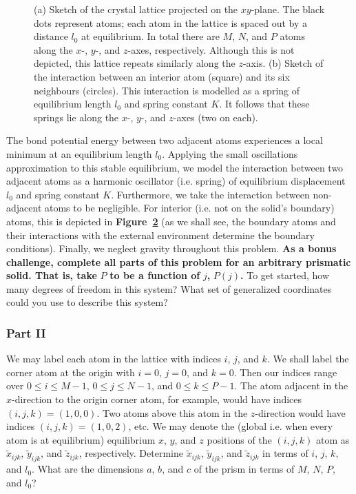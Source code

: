 \documentclass[letterpaper,12pt]{article}
\begin{document}
\begin{flushleft}
\begin{figure}[h]
\begin{subfigure}[b]{0.3\textwidth}
            \caption{}
            \label{fig:I3}
        \end{subfigure}
        \caption{(a) Sketch of the crystal lattice projected on the $xy$-plane. The black dots represent atoms; each atom in the lattice is spaced out by a distance $l_0$ at equilibrium. In total there are $M$, $N$, and $P$ atoms along the $x$-, $y$-, and $z$-axes, respectively. Although this is not depicted, this lattice repeats similarly along the $z$-axis. (b) Sketch of the interaction between an interior atom (square) and its six neighbours (circles). This interaction is modelled as a spring of equilibrium length $l_0$ and spring constant $K$. It follows that these springs lie along the $x$-, $y$-, and $z$-axes (two on each).}
    \end{figure}
    The bond potential energy between two adjacent atoms experiences a local minimum at an equilibrium length $l_0$. Applying the small oscillations approximation to this stable equilibrium, we model the interaction between two adjacent atoms as a harmonic oscillator (i.e. spring) of equilibrium displacement $l_0$ and spring constant $K$. Furthermore, we take the interaction between non-adjacent atoms to be negligible. For interior (i.e. not on the solid's boundary) atoms, this is depicted in \textbf{Figure~\ref{fig:I3}} (as we shall see, the boundary atoms and their interactions with the external environment determine the boundary conditions). Finally, we neglect gravity throughout this problem.\newline\newline
    \textbf{As a bonus challenge, complete all parts of this problem for an arbitrary prismatic solid. That is, take} $P$ \textbf{to be a function of} $j$\textbf{,} $P(j)$\textbf{.}\newline\newline
    To get started, how many degrees of freedom in this system? What set of generalized coordinates could you use to describe this system?

    \subsubsection*{Part II}
    We may label each atom in the lattice with indices $i$, $j$, and $k$. We shall label the corner atom at the origin with $i = 0$, $j = 0$, and $k = 0$. Then our indices range over $0 \leq i \leq M-1$, $0 \leq j \leq N-1$, and $0 \leq k \leq P-1$. The atom adjacent in the $x$-direction to the origin corner atom, for example, would have indices $(i, j, k) = (1, 0, 0)$. Two atoms above this atom in the $z$-direction would have indices $(i, j, k) = (1, 0, 2)$, etc. We may denote the (global i.e. when every atom is at equilibrium) equilibrium $x$, $y$, and $z$ positions of the $(i, j, k)$ atom as $\tilde{x}_{ijk}$, $\tilde{y}_{ijk}$, and $\tilde{z}_{ijk}$, respectively. \newline\newline
    Determine $\tilde{x}_{ijk}$, $\tilde{y}_{ijk}$, and $\tilde{z}_{ijk}$ in terms of $i$, $j$, $k$, and $l_0$. What are the dimensions $a$, $b$, and $c$ of the prism in terms of $M$, $N$, $P$, and $l_0$?


\end{flushleft}
\end{document}
